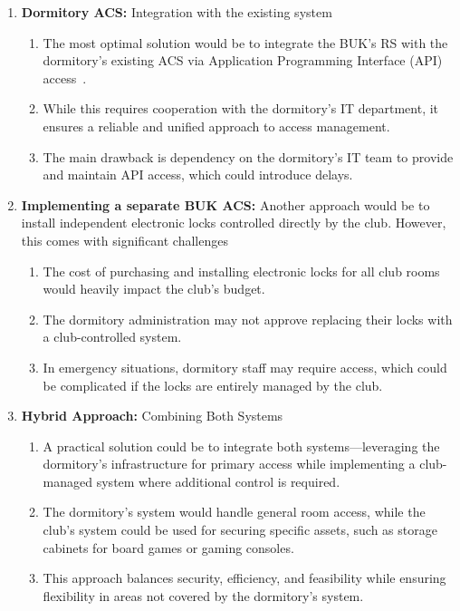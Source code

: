 \begin{enumerate}
  \item \textbf{Dormitory ACS:} Integration with the existing system
    \begin{enumerate}
      \item The most optimal solution would be to integrate the BUK’s RS with the dormitory’s existing ACS via Application Programming Interface (API) access~\cite{API}.
      \item While this requires cooperation with the dormitory’s IT department, it ensures a reliable and unified approach to access management.
      \item The main drawback is dependency on the dormitory’s IT team to provide and maintain API access, which could introduce delays.
    \end{enumerate}
  \item \textbf{Implementing a separate BUK ACS:} Another approach would be to install independent electronic locks controlled directly by the club. However, this comes with significant challenges
    \begin{enumerate}
      \item The cost of purchasing and installing electronic locks for all club rooms would heavily impact the club’s budget.
      \item The dormitory administration may not approve replacing their locks with a club-controlled system.
      \item In emergency situations, dormitory staff may require access, which could be complicated if the locks are entirely managed by the club.
    \end{enumerate}
  \item \textbf{Hybrid Approach:} Combining Both Systems
    \begin{enumerate}
      \item A practical solution could be to integrate both systems—leveraging the dormitory’s infrastructure for primary access while implementing a club-managed system where additional control is required.
      \item The dormitory’s system would handle general room access, while the club’s system could be used for securing specific assets, such as storage cabinets for board games or gaming consoles.
      \item This approach balances security, efficiency, and feasibility while ensuring flexibility in areas not covered by the dormitory’s system.
    \end{enumerate}
\end{enumerate}

